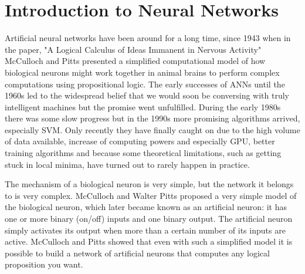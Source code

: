 
\section{Introduction to Neural Networks}
\newcommand{\derl}{\mathrm{\delta^\ell}}
\newcommand{\derL}{\mathrm{\delta^L}}
\newcommand{\derlj}{\mathrm{\delta^\ell_j}} 
\newcommand{\derLj}{\mathrm{\delta^L_j}} 
\newcommand{\derLn}{\mathrm{\delta^{L+1}}}
\newcommand{\derln}{\mathrm{\delta^{l+1}}}
\newcommand{\derLkn}{\mathrm{\delta_k^{L+1}}} 
\newcommand{\derlkn}{\mathrm{\delta_k^{l+1}}} 
\newcommand{\derCL}{\mathrm{\frac{\partial C}{\partial a_j^L}}}
\newcommand{\derCl}{\mathrm{\frac{\partial C}{\partial a_j^\ell}}}

Artificial neural networks have been around for a long time, since 1943 when in the paper, "A Logical Calculus of Ideas Immanent in Nervous Activity" McCulloch and Pitts presented a simplified computational model of how biological neurons might work together in animal brains to perform complex computations using propositional logic. The early successes of ANNs until the 1960s led to the widespread belief that we would soon be conversing with truly intelligent machines but the promise went unfulfilled. During the early 1980s there was some slow progress but in the 1990s more promising algorithms arrived, especially SVM. Only recently they have finally caught on due to the high volume of data available, increase of computing powers and especially GPU, better training algorithms and because some theoretical limitations, such as getting stuck in local minima, have turned out to rarely happen in practice.

The mechanism of a biological neuron is very simple, but the network it belongs to is very complex. McCulloch and Walter Pitts proposed a very simple model of the biological neuron, which later became known as an artificial neuron: it has one or more binary (on/off) inputs and one binary output. The artificial neuron simply activates its output when more than a certain number of its inputs are active. McCulloch and Pitts showed that even with such a simplified model it is possible to build a network of artificial neurons that computes any logical proposition you want.

